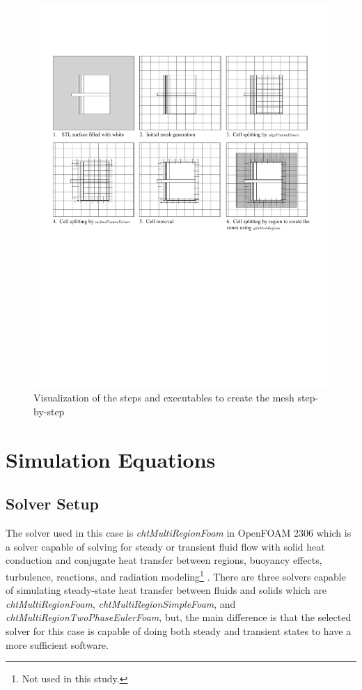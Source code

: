 \begin{figure}[htb]
     \centering
    \includegraphics[trim=1cm 11cm 1cm 3cm, clip, width=0.9\linewidth]{Figures/snappyhex.pdf}
     \caption[Mesh Creation Steps]{Visualization of the steps and executables to create the mesh step-by-step}
   \label{meshsteps}
 \end{figure}


\section{Simulation Equations}

\subsection{Solver Setup}
The solver used in this case is \textit{chtMultiRegionFoam} in OpenFOAM 2306 which is a solver capable of solving for steady or transient fluid flow with solid heat conduction and conjugate heat transfer between regions, buoyancy effects, turbulence, reactions, and radiation modeling\footnote{Not used in this study.} \cite{cht}.
There are three solvers capable of simulating steady-state heat transfer between fluids and solids which are \textit{chtMultiRegionFoam}, \textit{chtMultiRegionSimpleFoam}, and \textit{chtMultiRegionTwoPhaseEulerFoam}, but, the main difference is that the selected solver for this case is capable of doing both steady and transient states to have a more sufficient software. 

